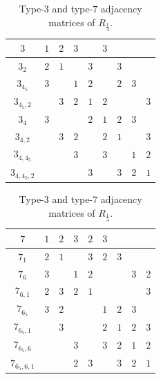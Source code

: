 \documentclass{amsart}
\theoremstyle{definition}
\theoremstyle{remark}
\begin{document}
\begin{table}
\begin{tabular}{|c||c|c|c|c|c|c|c|c|}
 \hhline{|=#=|=|=|=|=|=|=|=|}
$3$ & $1$ & $2$ & $3$ &  & $3$ &  &  & \\ \hline
$3_2$ & $2$ & $1$ &  & $3$ &  & $3$ &  & \\ \hline
$3_{4_5}$ & $3$ &  & $1$ & $2$ &  & $2$ & $3$ & \\ \hline
$3_{4_5,2}$ &  & $3$ & $2$ & $1$ & $2$ &  &  & $3$ \\ \hline
$3_{4}$ & $3$ &  &  & $2$ & $1$ & $2$ & $3$ & \\ \hline
$3_{4,2}$ &  & $3$ & $2$ &  & $2$ & $1$ &  & $3$ \\ \hline
$3_{4,4_5}$ &  &  & $3$ &  & $3$ &  & $1$ & $2$ \\ \hline
$3_{4,4_5,2}$ &  &  &  & $3$ &  & $3$ & $2$ & $1$\\ \hline
\end{tabular} \hspace{20pt}
\begin{tabular}{|c||c|c|c|c|c|c|c|c|}
 \hhline{|=#=|=|=|=|=|=|=|=|}
$7$ & $1$ & $2$ & $3$ & $2$ & $3$ &  &  & \\ \hline
$7_1$ & $2$ & $1$ &  & $3$ & $2$ & $3$ &  & \\ \hline
$7_{6}$ & $3$ &  & $1$ & $2$ &  &  & $3$ & $2$ \\ \hline
$7_{6,1}$ & $2$ & $3$ & $2$ & $1$ &  &  &  & $3$ \\ \hline
$7_{6_5}$ & $3$ & $2$ &  &  & $1$ & $2$ & $3$ & \\ \hline
$7_{6_5,1}$ &  & $3$ &  &  & $2$ & $1$ & $2$ & $3$ \\ \hline
$7_{6_5,6}$ &  &  & $3$ &  & $3$ & $2$ & $1$ & $2$ \\ \hline
$7_{6_5,6,1}$ &  &  & $2$ & $3$ &  & $3$ & $2$ & $1$\\ \hline
\end{tabular}
\caption{Type-$3$ and type-$7$ adjacency matrices of $R_{\frac{1}{4}}$.}\label{tr3}
\end{table}
\end{document}

